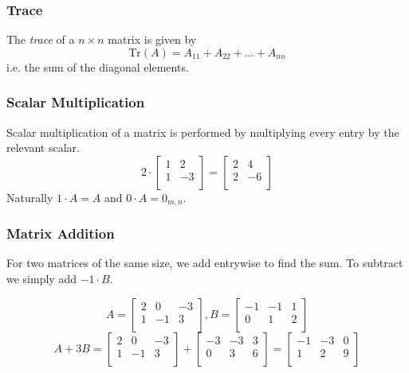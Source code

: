 \documentclass[12pt]{report}
\begin{document}
\begin{flushleft}
\subsubsection*{Trace}

The \textit{trace} of a \(n \times n\) matrix is given by
\[\mathrm{Tr}(A) = A_{11} + A_{22} + \ldots + A_{nn}\]
i.e. the sum of the diagonal elements. \par

\subsubsection*{Scalar Multiplication}

Scalar multiplication of a matrix is performed by multiplying every entry by
the relevant scalar.
\[
    2 \cdot
    \left[\begin{array}{cc}
        1 & 2 \\
        1 & -3 \\
    \end{array}\right]
    =
    \left[\begin{array}{cc}
        2 & 4 \\
        2 & -6 \\
    \end{array}\right]
\]
Naturally \(1 \cdot A = A\) and \(0 \cdot A = 0_{m,n}\).

\subsubsection*{Matrix Addition}

For two matrices of the same size, we add entrywise to find the sum. To subtract
we simply add \(-1 \cdot B\).

\[
    A = 
    \left[\begin{array}{ccc}
        2 & 0 & -3 \\
        1 & -1 & 3 \\
    \end{array}\right]
    , B =
    \left[\begin{array}{ccc}
        -1 & -1 & 1 \\
        0 & 1 & 2 \\
    \end{array}\right]
\]
\[
    A + 3B =
    \left[\begin{array}{ccc}
        2 & 0 & -3 \\
        1 & -1 & 3 \\
    \end{array}\right]
    +
    \left[\begin{array}{ccc}
        -3 & -3 & 3 \\
        0 & 3 & 6 \\
    \end{array}\right]
    =
    \left[\begin{array}{ccc}
        -1 & -3 & 0 \\
        1 & 2 & 9 \\
    \end{array}\right]
\]


\end{flushleft}
\end{document}
